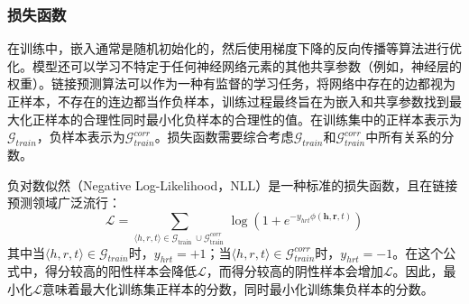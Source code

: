 \documentclass[twocolumn]{article}
\begin{document}
\subsubsection{损失函数}
在训练中，嵌入通常是随机初始化的，然后使用梯度下降的反向传播等算法进行优化。模型还可以学习不特定于任何神经网络元素的其他共享参数（例如，神经层的权重）。链接预测算法可以作为一种有监督的学习任务，将网络中存在的边都视为正样本，不存在的连边都当作负样本，训练过程最终旨在为嵌入和共享参数找到最大化正样本的合理性同时最小化负样本的合理性的值。在训练集中的正样本表示为$\mathcal{G}_{train}$，负样本表示为$\mathcal{G}_{train}^{corr}$。损失函数需要综合考虑$\mathcal{G}_{train}$和$\mathcal{G}_{train}^{corr}$中所有关系的分数。\par
负对数似然（Negative Log-Likelihood，NLL）是一种标准的损失函数，且在链接预测领域广泛流行：
$$\mathcal{L}=\sum_{\langle h, r, t\rangle \in \mathcal{G}_{\text {train }} \cup \mathcal{G}_{\text {train }}^{c o r r}} \log \left(1+e^{-y_{h r t} \phi(\boldsymbol{h}, \boldsymbol{r}, t)}\right)$$
其中当$\langle h, r, t\rangle \in \mathcal{G}_{train}$时，$y_{hrt}=+1$；当$\langle h, r, t\rangle \in \mathcal{G}_{train}^{corr}$时，$y_{hrt}=-1$。在这个公式中，得分较高的阳性样本会降低$\mathcal{L}$，而得分较高的阴性样本会增加$\mathcal{L}$。因此，最小化$\mathcal{L}$意味着最大化训练集正样本的分数，同时最小化训练集负样本的分数。\par
\end{document}
